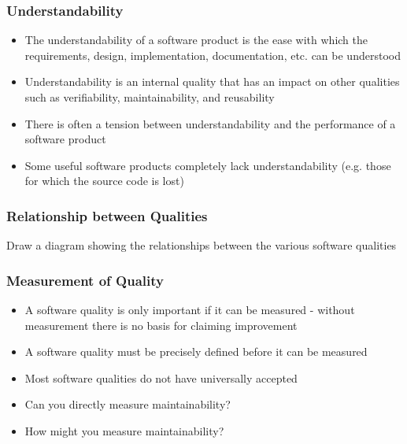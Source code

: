 \documentclass[t,12pt,numbers,fleqn]{beamer}
\begin{document}

\begin{frame}
\frametitle{Understandability}

\begin{itemize}
\item The understandability of a software product is the ease with which the
  requirements, design, implementation, documentation, etc. can be understood
\item Understandability is an internal quality that has an impact on other
  qualities such as verifiability, maintainability, and reusability
\item There is often a tension between understandability and the performance of
  a software product
\item Some useful software products completely lack understandability
  (e.g. those for which the source code is lost)
\end{itemize}

\end{frame}


\begin{frame}
\frametitle{Relationship between Qualities}

Draw a diagram showing the relationships between the various software qualities

\end{frame}


\begin{frame}
\frametitle{Measurement of Quality}

\begin{itemize}
\item A software quality is only important if it can be measured - without
  measurement there is no basis for claiming improvement
\item A software quality must be precisely defined before it can be measured
\item Most software qualities do not have universally accepted
\item Can you directly measure maintainability?
\item How might you measure maintainability?
\end{itemize}

\end{frame}
\end{document}
